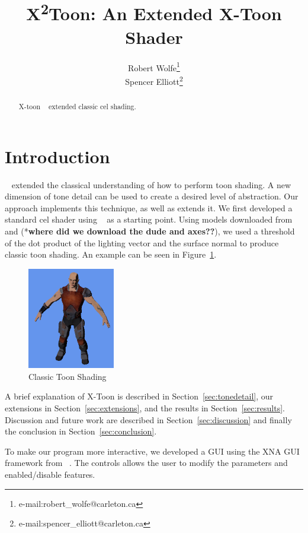 \documentclass[annual]{acmsiggraph}
\title{X\texorpdfstring{\textsuperscript{2}}-Toon: An Extended X-Toon Shader}
\author{Robert Wolfe\thanks{e-mail:robert\_wolfe@carleton.ca}\\Spencer Elliott\thanks{e-mail:spencer\_elliott@carleton.ca}}
\begin{document}
\maketitle

\begin{abstract}

X-toon ~\cite{BTM06a} extended classic cel shading.

\end{abstract}

\keywordlist

\copyrightspace

\section{Introduction}
~\cite{BTM06a} extended the classical understanding of how to perform toon shading. A new dimension of tone detail can be used to create a desired level of abstraction. Our approach implements this technique, as well as extends it. We first developed a standard cel shader using ~\cite{CelShadingTut} as a starting point. Using models downloaded from ~\cite{TurboSquid} and (*\textbf{where did we download the dude and axes??}), we used a threshold of the dot product of the lighting vector and the surface normal to produce classic toon shading. An example can be seen in Figure~\ref{fig:toonshade}.

\begin{figure}[h]
	\centering
	\includegraphics[width=1.5in]{images/classic_cel2}
	\caption{Classic Toon Shading}
	\label{fig:toonshade}
\end{figure}

A brief explanation of X-Toon is described in Section~\ref{sec:tonedetail}, our extensions in Section~\ref{sec:extensions}, and the results in Section~\ref{sec:results}. Discussion and future work are described in Section~\ref{sec:discussion} and finally the conclusion in Section~\ref{sec:conclusion}.

To make our program more interactive, we developed a GUI using the XNA GUI framework from ~\cite{Ruminate}. The controls allows the user to modify the parameters and enabled/disable features.
\end{document}
